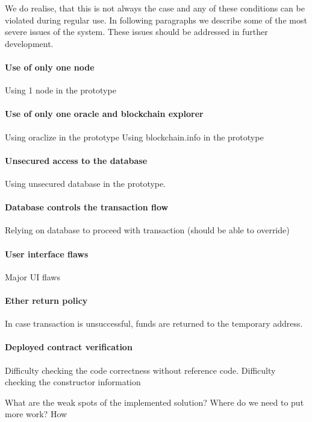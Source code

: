 We do realise, that this is not always the case and any of these conditions can be violated during regular use. In following paragraphs we describe some of the most severe issues of the system. These issues should be addressed in further development.

\paragraph{Use of only one node}
Using 1 node in the prototype

\paragraph{Use of only one oracle and blockchain explorer}
Using oraclize in the prototype
Using blockchain.info in the prototype

\paragraph{Unsecured access to the database}
Using unsecured database in the prototype.

\paragraph{Database controls the transaction flow}
Relying on database to proceed with transaction (should be able to override)

\paragraph{User interface flaws}
Major UI flaws

\paragraph{Ether return policy}
In case transaction is unsuccessful, funds are returned to the temporary address.

\paragraph{Deployed contract verification}
Difficulty checking the code correctness without reference code.
Difficulty checking the constructor information



What are the weak spots of the implemented solution? Where do we need to put more work? How